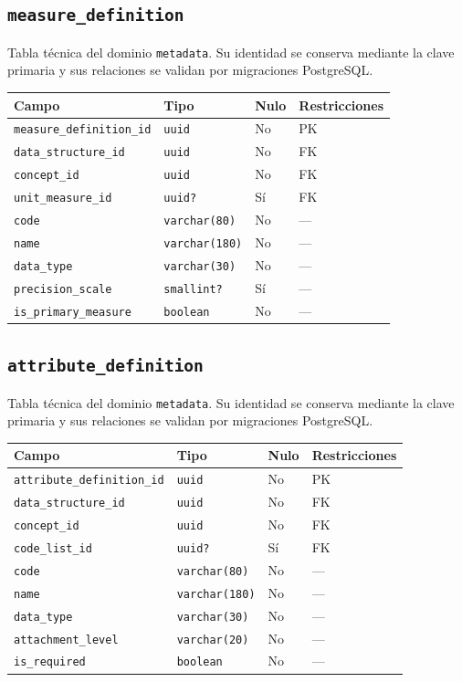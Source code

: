 \documentclass[11pt]{article}
\begin{document}
\subsection{\texttt{measure\_definition}}
Tabla técnica del dominio \texttt{metadata}. Su identidad se conserva mediante la clave primaria y sus relaciones se validan por migraciones PostgreSQL.
\begin{longtable}{>{\raggedright\arraybackslash}p{} p{} p{} p{}}
\toprule Campo & Tipo & Nulo & Restricciones \\ \midrule\endhead
\texttt{measure\_definition\_id} & \texttt{uuid} & No & PK \\
\texttt{data\_structure\_id} & \texttt{uuid} & No & FK \\
\texttt{concept\_id} & \texttt{uuid} & No & FK \\
\texttt{unit\_measure\_id} & \texttt{uuid?} & Sí & FK \\
\texttt{code} & \texttt{varchar(80)} & No & --- \\
\texttt{name} & \texttt{varchar(180)} & No & --- \\
\texttt{data\_type} & \texttt{varchar(30)} & No & --- \\
\texttt{precision\_scale} & \texttt{smallint?} & Sí & --- \\
\texttt{is\_primary\_measure} & \texttt{boolean} & No & --- \\
\bottomrule\end{longtable}
\subsection{\texttt{attribute\_definition}}
Tabla técnica del dominio \texttt{metadata}. Su identidad se conserva mediante la clave primaria y sus relaciones se validan por migraciones PostgreSQL.
\begin{longtable}{>{\raggedright\arraybackslash}p{} p{} p{} p{}}
\toprule Campo & Tipo & Nulo & Restricciones \\ \midrule\endhead
\texttt{attribute\_definition\_id} & \texttt{uuid} & No & PK \\
\texttt{data\_structure\_id} & \texttt{uuid} & No & FK \\
\texttt{concept\_id} & \texttt{uuid} & No & FK \\
\texttt{code\_list\_id} & \texttt{uuid?} & Sí & FK \\
\texttt{code} & \texttt{varchar(80)} & No & --- \\
\texttt{name} & \texttt{varchar(180)} & No & --- \\
\texttt{data\_type} & \texttt{varchar(30)} & No & --- \\
\texttt{attachment\_level} & \texttt{varchar(20)} & No & --- \\
\texttt{is\_required} & \texttt{boolean} & No & --- \\
\bottomrule\end{longtable}
\end{document}
